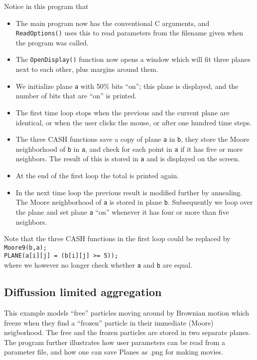 \documentclass[12pt]{article}
\begin{document}
Notice in this program that
\begin{itemize}
\item The main program now has the conventional C
arguments, and {\tt ReadOptions()} uses this to read
parameters from the filename given when the program was called.
\item The {\tt OpenDisplay()} function now opens a
window which will fit three planes next to each other,
plus margins around them.
\item We initialize plane {\tt a} with 50\% bits ``on'';
this plane is displayed, and the number of bits that are ``on''
is printed.
\item The first time loop stops when the previous and
the current plane are identical, or when the user clicks the mouse,
or after one hundred time steps.
\item The three CASH functions save a copy of plane {\tt a}
in {\tt b}, they store the Moore neighborhood of {\tt b} in {\tt a},
and check for each point in {\tt a} if it has five or more neighbors.
The result of this is stored in {\tt a} and is displayed
on the screen.
\item At the end of the first loop the total is printed again.
\item In the next time loop the previous result is modified
further by annealing.
The Moore neighborhood of {\tt a} is stored in plane {\tt b}.
Subsequently we loop over the plane and set plane {\tt a} ``on''
whenever it has four or more than five neighbors.
\end{itemize}

Note that the three CASH functions in the first loop 
could be replaced by
\texttt{\\Moore9(b,a);\\PLANE(a[i][j] = (b[i][j] >= 5));\\}
where we however no longer check whether {\tt a} and {\tt b} are equal.

\subsection{Diffussion limited aggregation}
This example models ``free'' particles moving around by Brownian
motion which freeze when they find a ``frozen'' particle in their
immediate (Moore) neigborhood. The free
and the frozen particles are stored in two separate planes.
The program further illustrates how user parameters can be read from a parameter
file, and how one can save Planes as .png for making movies.
\end{document}
